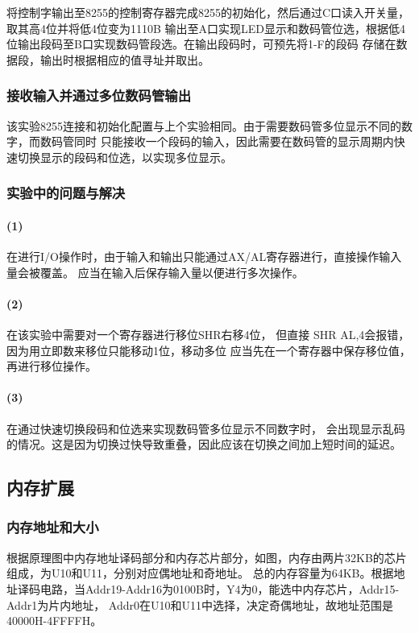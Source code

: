 \documentclass[12pt, a4paper, oneside]{ctexart}
\begin{document}
    将控制字输出至8255的控制寄存器完成8255的初始化，然后通过C口读入开关量，取其高4位并将低4位变为1110B
    输出至A口实现LED显示和数码管位选，根据低4位输出段码至B口实现数码管段选。在输出段码时，可预先将1-F的段码
    存储在数据段，输出时根据相应的值寻址并取出。


    \subsubsection{接收输入并通过多位数码管输出}
    该实验8255连接和初始化配置与上个实验相同。由于需要数码管多位显示不同的数字，而数码管同时
    只能接收一个段码的输入，因此需要在数码管的显示周期内快速切换显示的段码和位选，以实现多位显示。

    \subsubsection{实验中的问题与解决}
    \paragraph{(1)} 在进行I/O操作时，由于输入和输出只能通过AX/AL寄存器进行，直接操作输入量会被覆盖。
    应当在输入后保存输入量以便进行多次操作。

    \paragraph{(2)} 在该实验中需要对一个寄存器进行移位SHR右移4位，
    但直接 SHR AL,4会报错，因为用立即数来移位只能移动1位，移动多位
    应当先在一个寄存器中保存移位值，再进行移位操作。

    \paragraph{(3)} 在通过快速切换段码和位选来实现数码管多位显示不同数字时，
    会出现显示乱码的情况。这是因为切换过快导致重叠，因此应该在切换之间加上短时间的延迟。


    

    \subsection{内存扩展}
    \subsubsection{内存地址和大小}
    根据原理图中内存地址译码部分和内存芯片部分，如图，内存由两片32KB的芯片组成，为U10和U11，分别对应偶地址和奇地址。
    总的内存容量为64KB。根据地址译码电路，当Addr19-Addr16为0100B时，Y4为0，能选中内存芯片，Addr15-Addr1为片内地址，
    Addr0在U10和U11中选择，决定奇偶地址，故地址范围是40000H-4FFFFH。
\end{document}
